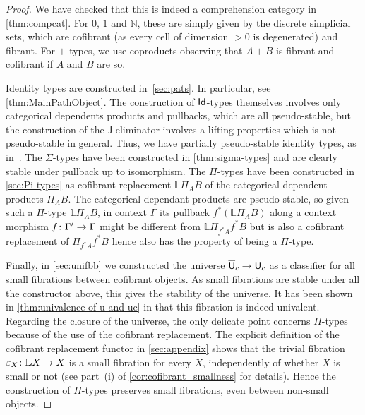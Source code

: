 \documentclass[reqno,10pt,a4paper,oneside,draft]{amsart}
\begin{document}
\begin{proof}
We have checked that this is indeed a comprehension category in \cref{thm:compcat}. 
For $0$, $1$ and $\mathbb{N}$, these are simply given by the discrete simplicial sets, which are cofibrant (as every cell of dimension $>0$ is degenerated) and fibrant. For $+$ types, we use coproducts observing that
 $A + B$ is fibrant and cofibrant if $A$ and $B$ are so. 
 
Identity types are constructed in~\cref{sec:pats}. In particular, see \cref{thm:MainPathObject}. The construction of $\mathsf{Id}$-types themselves involves only categorical dependents products and pullbacks, which are all pseudo-stable, but the construction of the $\mathsf{J}$-eliminator involves a lifting properties which is not pseudo-stable 
in general. Thus, we have partially pseudo-stable identity types, as in~\cite[Definition 2.3.4]{LumsdaineP:locuoc}. The $\Sigma$-types have been constructed in \cref{thm:sigma-types} and are clearly stable under pullback up to isomorphism.  
The $\Pi$-types have been constructed in \cref{sec:Pi-types} as cofibrant replacement $\mathbb{L} \Pi_A B$ of the categorical dependent products $\Pi_A B$. The categorical dependant products are pseudo-stable, so given such a $\Pi$-type $\mathbb{L} \Pi_A B$, in context $\Gamma$ its pullback $f^*( \mathbb{L} \Pi_A B)$ along a context morphism $f \colon \Gamma' \rightarrow \Gamma$ might be different from $\mathbb{L} \Pi_{f^* A} f^* B$ but is also a cofibrant replacement of $\Pi_{f^* A} f^* B$ hence also has the property of being a $\Pi$-type.

Finally, in \cref{sec:unifbb} we constructed the universe $\overline{\mathsf{U}}_c \rightarrow \mathsf{U}_c$ as a classifier for all small fibrations between cofibrant objects. As small fibrations are stable under all the constructor above, this gives the stability of the universe. It has been shown in \cref{thm:univalence-of-u-and-uc} in that this fibration is indeed univalent. Regarding the closure of the universe, the only delicate point concerns $\Pi$-types because of the
use of the cofibrant replacement.  The explicit definition of the cofibrant replacement functor 
in  \cref{sec:appendix} shows that  the trivial fibration $\varepsilon_X \colon \mathbb{L} X \rightarrow X$ is a small fibration for every $X$, independently of whether $X$ is small or not (see part~(i) of \cref{cor:cofibrant_smallness} for details). Hence the construction of $\Pi$-types  preserves small fibrations, even between non-small objects.
\end{proof}
\end{document}
